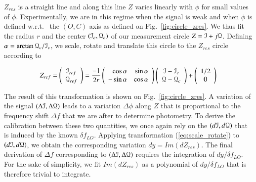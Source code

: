 $Z_{res}$ is a straight line and along this line $Z$ varies linearly with
$\phi$ for small values of $\phi$. Experimentally, we are in this regime
when the signal is weak and when $\phi$ is defined w.r.t.~ the $(O,C)$ axis
as defined on Fig.~\ref{fig:circle_zres}. We thus fit the radius $r$ and the
center $(\mathcal{I}_c,\mathcal{Q}_c)$ of our measurement circle $Z=\mathcal{I}+j\mathcal{Q}$. Defining
$\alpha=\arctan\mathcal{Q}_c/\mathcal{I}_c$, we scale, rotate and translate this
circle to the $Z_{res}$ circle according to

\begin{equation}
Z_{ref} = \left(\begin{array}{c}
\mathcal{I}_{ref}\\
\mathcal{Q}_{ref}\end{array}\right) = 
\frac{-1}{2r}\left(\begin{array}{rr}
\cos\alpha & \sin\alpha\\
-\sin\alpha & \cos\alpha\end{array}\right)
\left(\begin{array}{c}
\mathcal{I}-\mathcal{I}_c\\
\mathcal{Q}-\mathcal{Q}_c\end{array}\right) +
\left(\begin{array}{c}
1/2\\
0\end{array}\right)
\label{eq:scale_rotate}
\end{equation}

The result of this transformation is shown on Fig.~\ref{fig:circle_zres}. A
variation of the signal $(\Delta\mathcal{I},\Delta\mathcal{Q})$ leads to a variation
$\Delta\phi$ along $Z$ that is proportional to the frequency shift $\Delta f$
that we are after to determine photometry. To derive the calibration between
these two quantities, we once again rely on the $(d\mathcal{I},d\mathcal{Q})$ that is induced by
the known $\delta f_{LO}$. Applying transformation (\ref{eq:scale_rotate}) to
$(d\mathcal{I},d\mathcal{Q})$, we obtain the corresponding variation $dy = Im(dZ_{res})$. The
final derivation of $\Delta f$ corresponding to $(\Delta\mathcal{I},\Delta\mathcal{Q})$ requires
the integration of $dy/\delta f_{LO}$. For the sake of simplicity, we fit
$Im(dZ_{res})$ as a polynomial of $dy/\delta f_{LO}$ that is therefore trivial
to integrate.\\



